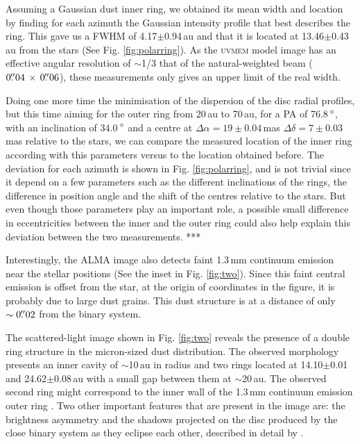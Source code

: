\documentclass[letters,usenatbib,times]{mnras}
\begin{document}
Assuming a Gaussian dust inner ring, we obtained its mean width and location by finding for each azimuth the Gaussian intensity profile that best describes the ring. This gave us a FWHM of 4.17$\pm$0.94\,au and that it is located at 13.46$\pm$0.43\,au from the stars (See Fig. \ref{fig:polarring}). As the \textsc{uvmem} model image has an effective angular resolution of $\sim$1/3 that of the natural-weighted beam ($0\hbox{$.\!\!^{\prime\prime}$}04 \,\times \, 0\hbox{$.\!\!^{\prime\prime}$}06$), these measurements only gives an upper limit of the real width.

Doing one more time the minimisation of the dispersion of the disc radial profiles, but this time aiming for the outer ring from 20\,au to 70\,au, for a PA of 76.8\,$\hbox{$^\circ$}$, with an inclination of 34.0\,$\hbox{$^\circ$}$ and a centre at $\Delta \alpha = 19\pm0.04$\,mas $\Delta \delta = 7\pm0.03$\,mas relative to the stars, we can compare the measured location of the inner ring according with this parameters versus to the location obtained before. The deviation for each azimuth is shown in Fig. \ref{fig:polarring}, and is not trivial since it depend on a few parameters such as the different inclinations of the rings, the difference in position angle and the shift of the centres relative to the stars. But even though those parameters play an important role, a possible small difference in eccentricities between the inner and the outer ring could also help explain this deviation between the two measurements. ***

Interestingly, the ALMA image also detects faint 1.3\,mm continuum emission near the stellar positions (See the inset in Fig. \ref{fig:two}). Since this faint central emission is offset from the star, at the origin of coordinates in the figure, it is probably due to large dust grains. This dust structure is at a distance of only $\sim0\hbox{$.\!\!^{\prime\prime}$}02$ from the binary system.

The scattered-light image shown in Fig. \ref{fig:two} reveals the presence of a double ring structure in the micron-sized dust distribution. The observed morphology presents an inner cavity of $\sim$10\,au in radius and two rings located at 14.10$\pm$0.01 and 24.62$\pm$0.08\,au with a small gap between them at $\sim$20\,au. The observed second ring might correspond to the inner wall of the 1.3\,mm continuum emission outer ring \citep{Ru_z_Rodr_guez_2019}. Two other important features that are present in the image are: the brightness asymmetry and the shadows projected on the disc produced by the close binary system as they eclipse each other, described in detail by \citet{dOrazi}.
\end{document}
